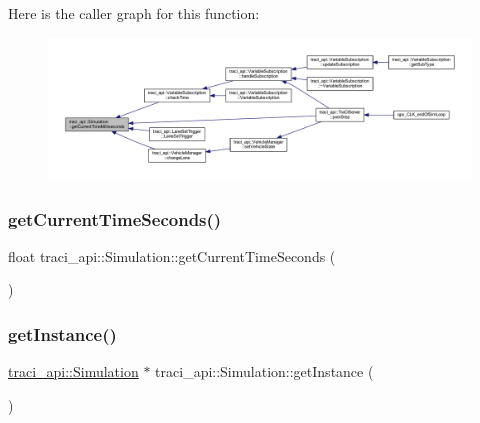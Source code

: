 Here is the caller graph for this function\+:
\nopagebreak
\begin{figure}[H]
\begin{center}
\leavevmode
\includegraphics[width=350pt]{classtraci__api_1_1_simulation_a43ce3d282a312c2e6735cdcd4343b0a7_icgraph}
\end{center}
\end{figure}
\mbox{\label{classtraci__api_1_1_simulation_a8e9cc88461dfab200eabf626fcdb8280}} 
\subsubsection{\texorpdfstring{get\+Current\+Time\+Seconds()}{getCurrentTimeSeconds()}}
{\footnotesize\ttfamily float traci\+\_\+api\+::\+Simulation\+::get\+Current\+Time\+Seconds (\begin{DoxyParamCaption}{ }\end{DoxyParamCaption})}

\mbox{\label{classtraci__api_1_1_simulation_a5bd3febd1571525c2dac2b68e37f694e}} 
\subsubsection{\texorpdfstring{get\+Instance()}{getInstance()}}
{\footnotesize\ttfamily \hyperlink{classtraci__api_1_1_simulation}{traci\+\_\+api\+::\+Simulation} $\ast$ traci\+\_\+api\+::\+Simulation\+::get\+Instance (\begin{DoxyParamCaption}{ }\end{DoxyParamCaption})\hspace{0.3cm}{\ttfamily [static]}}

